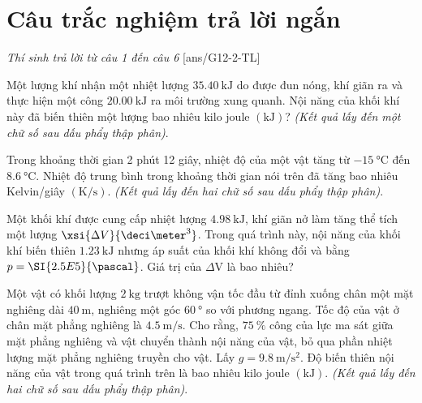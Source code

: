 \section{Câu trắc nghiệm trả lời ngắn} \textit{Thí sinh trả lời từ câu 1 đến câu 6}
\setcounter{ex}{0}
[ans/G12-2-TL]
\begin{ex}
	Một lượng khí nhận một nhiệt lượng $\SI{35.40}{\kilo\joule}$ do được đun nóng, khí giãn ra và thực hiện một công $\SI{20.00}{\kilo\joule}$ ra môi trường xung quanh. Nội năng của khối khí này đã biến thiên một lượng bao nhiêu kilo joule $\left(\si{\kilo\joule}\right)$? \textit{(Kết quả lấy đến một chữ số sau dấu phẩy thập phân)}.	
\end{ex}
\begin{ex}
	Trong khoảng thời gian 2 phút 12 giây, nhiệt độ của một vật tăng từ $\SI{-15}{\celsius}$ đến $\SI{8.6}{\celsius}$. Nhiệt độ trung bình trong khoảng thời gian nói trên đã tăng bao nhiêu Kelvin/giây $\left(\si{\kelvin/\second}\right)$. \textit{(Kết quả lấy đến hai chữ số sau dấu phẩy thập phân)}.
\end{ex}
\begin{ex}
	Một khối khí được cung cấp nhiệt lượng $\SI{4.98}{\kilo\joule}$, khí giãn nở làm tăng thể tích một lượng $\xsi{\Delta V}{\deci\meter^3}$. Trong quá trình này, nội năng của khối khí biến thiên $\SI{1.23}{\kilo\joule}$ nhưng áp suất của khối khí không đổi và bằng $p=\SI{2.5E5}{\pascal}$. Giá trị của $\Delta \mathrm{V}$ là bao nhiêu?	
\end{ex}
\begin{ex}
	Một vật có khối lượng $\SI{2}{\kilogram}$ trượt không vận tốc đầu từ đỉnh xuống chân một mặt nghiêng dài $\SI{40}{\meter}$, nghiêng một góc $\SI{60}{\degree}$ so với phương ngang. Tốc độ của vật ở chân mặt phẳng nghiêng là $\SI{4.5}{\meter/\second}$. Cho rằng, $\SI{75}{\percent}$ công của lực ma sát giữa mặt phẳng nghiêng và vật chuyển thành nội năng của vật, bỏ qua phần nhiệt lượng mặt phẳng nghiêng truyền cho vật. Lấy $g=\SI{9.8}{\meter/\second^2}$. Độ biến thiên nội năng của vật trong quá trình trên là bao nhiêu kilo joule $\left(\si{\kilo\joule}\right)$. \textit{(Kết quả lấy đến hai chữ số sau dấu phẩy thập phân)}.
\end{ex}
